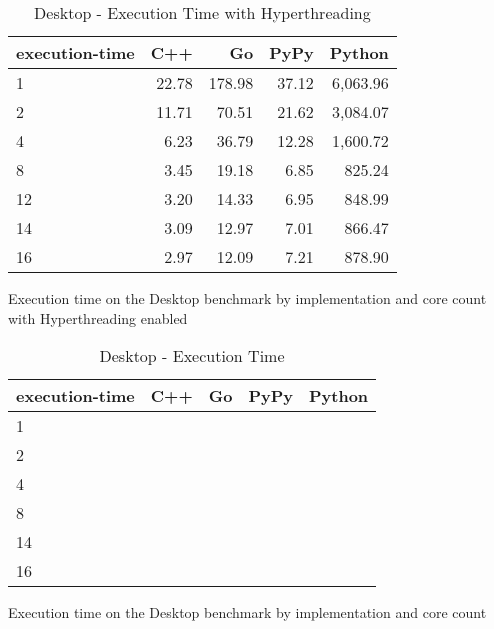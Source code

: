 \begin{table}[H]
 \centering
    \begin{tabular}{lrrrr}
    \hline
    execution-time & C++ & Go & PyPy & Python \\
    \hline
    1 & 22.78 & 178.98 & 37.12 & 6,063.96 \\
    2 & 11.71 & 70.51 & 21.62 & 3,084.07 \\
    4 & 6.23 & 36.79 & 12.28 & 1,600.72 \\
    8 & 3.45 & 19.18 & 6.85 & 825.24 \\
    12 & 3.20 & 14.33 & 6.95 & 848.99 \\
    14 & 3.09 & 12.97 & 7.01 & 866.47 \\
    16 & 2.97 & 12.09 & 7.21 & 878.90 \\
    \hline
    \end{tabular}
\caption{Desktop - Execution Time with Hyperthreading}{Execution time on the Desktop benchmark by implementation and core count with Hyperthreading enabled}
\label{tab:desktop-execution-time-hyperthreading}
\end{table}

\begin{table}[H]
    \centering
    \begin{tabular}{lrrrr}
        \hline
        execution-time & C++                 & Go          & PyPy       & Python              \\
        \hline
        1              &                     &             &            &                    \\
        2              &                     &             &            &                    \\
        4              &                     &             &            &                    \\
        8	           &                     &             &            &                    \\
        14             &                     &             &            &                    \\
        16             &                     &             &            &                    \\
        \hline
    \end{tabular}
\caption{Desktop - Execution Time}{Execution time on the Desktop benchmark by implementation and core count}
\label{tab:desktop-execution-time}
\end{table}

